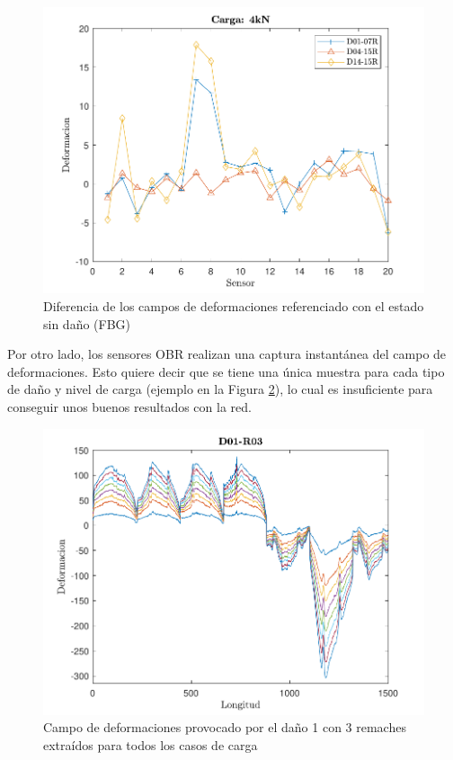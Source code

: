 \begin{figure}[h!]
    \centering
    \includegraphics[width=125mm, angle=0]{3/Fotos/FBG_dif.pdf}
    \captionsetup{justification=centering,margin=1.25cm}
    \caption{Diferencia de los campos de deformaciones referenciado con el estado sin daño (FBG)}
    \label{FBGR_dif}
\end{figure}



    

\vspace*{10pt}
    
Por otro lado, los sensores OBR realizan una captura instantánea del campo de deformaciones. Esto quiere decir que se tiene una única muestra para cada tipo de daño y nivel de carga (ejemplo en la Figura \ref{fig:D01-R3}), lo cual es insuficiente para conseguir unos buenos resultados con la red.\\

\begin{figure}[h!]
    \centering
    \includegraphics[width=125mm, angle=0]{3/Fotos/D01-R3.pdf}
    \captionsetup{justification=centering,margin=1.25cm}
    \caption{Campo de deformaciones provocado por el daño 1 con 3 remaches extraídos para todos los casos de carga}
    \label{fig:D01-R3}
\end{figure}
    
